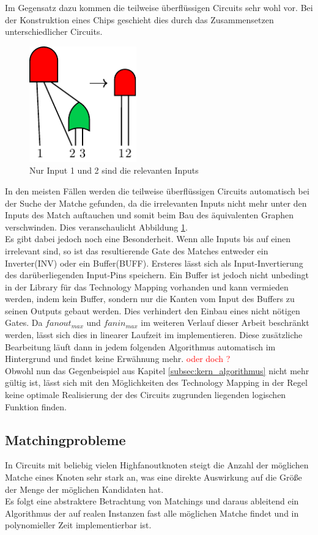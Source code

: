 \documentclass[11pt, a4paper, german]{article}
\newcommand{\TM}{Technology  Mapping }
\begin{document}
Im Gegensatz dazu kommen die teilweise überflüssigen Circuits sehr wohl vor. Bei der Konstruktion eines Chips geschieht dies durch das Zusammensetzen unterschiedlicher Circuits.\\
 \begin{figure}
		\includegraphics[height = 5cm]{pictures/compiled/partly_redundant}
		\caption{Nur Input 1 und 2 sind die relevanten Inputs}
		\label{bild:partly_redundant}
\end{figure}
In den meisten Fällen werden die teilweise überflüssigen Circuits automatisch bei der  Suche der Matche gefunden, da die irrelevanten Inputs nicht mehr unter den Inputs des Match auftauchen und somit beim Bau des äquivalenten Graphen verschwinden. Dies veranschaulicht Abbildung \ref{bild:partly_redundant}. \\
Es gibt dabei jedoch noch eine Besonderheit. Wenn alle Inputs bis auf einen irrelevant sind, so ist das resultierende Gate des Matches entweder ein Inverter(INV) oder ein Buffer(BUFF). Ersteres lässt sich als Input-Invertierung des darüberliegenden Input-Pins speichern. Ein Buffer ist jedoch nicht unbedingt in der Library für das \TM vorhanden und kann vermieden werden, indem kein Buffer, sondern nur die Kanten vom Input des Buffers zu seinen Outputs gebaut werden. Dies verhindert den Einbau eines nicht nötigen Gates. Da $fanout_{max}$ und $fanin_{max}$ im weiteren Verlauf dieser Arbeit beschränkt werden, lässt sich dies in linearer Laufzeit im implementieren. Diese zusätzliche Bearbeitung läuft dann in jedem folgenden Algorithmus automatisch im Hintergrund und findet keine Erwähnung mehr. \textcolor{red}{oder doch ?}\\
 Obwohl nun das Gegenbeispiel aus Kapitel \ref{subsec:kern_algorithmus} nicht mehr gültig ist, lässt sich mit den Möglichkeiten des \TM in der Regel keine optimale Realisierung der des Circuits zugrunden liegenden logischen Funktion finden.
 
 
\subsection{Matchingprobleme}
\label{subsec:match_kandidaten}
In Circuits mit beliebig vielen Highfanoutknoten steigt die Anzahl der möglichen Matche eines Knoten sehr stark an, was eine direkte Auswirkung auf die Größe der Menge der möglichen Kandidaten hat. \\
Es folgt eine abstraktere Betrachtung von Matchings und daraus ableitend ein Algorithmus der auf realen Instanzen fast alle möglichen Matche findet und in polynomieller Zeit implementierbar ist.
\end{document}
